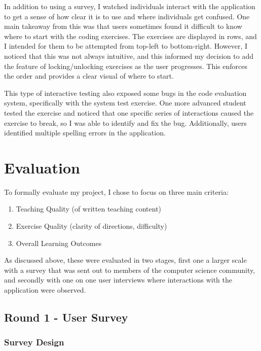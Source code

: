 \documentclass[10pt,twocolumn]{article}
\begin{document}
In addition to using a survey, I watched individuals interact with the application to get a sense of how clear it is to 
use and where individuals get confused. One main takeaway from this was that users sometimes found it difficult to know 
where to start with the coding exercises. The exercises are displayed in rows, and I intended for them to be attempted 
from top-left to bottom-right. However, I noticed that this was not always intuitive, and this informed my decision to 
add the feature of locking/unlocking exercises as the user progresses. This enforces the order and provides a clear visual
of where to start. 

This type of interactive testing also exposed some bugs in the code evaluation system, specifically with the system test
exercise. One more advanced student tested the exercise and noticed that one specific series of interactions caused the 
exercise to break, so I was able to identify and fix the bug. Additionally, users identified multiple spelling errors in 
the application. 


\section{Evaluation}

To formally evaluate my project, I chose to focus on three main criteria:

\begin{enumerate}
    \item Teaching Quality (of written teaching content)
    \item Exercise Quality (clarity of directions, difficulty)
    \item Overall Learning Outcomes
\end{enumerate}

As discussed above, these were evaluated in two stages, first one a larger scale with a survey that was sent out to 
members of the computer science community, and secondly with one on one user interviews where interactions with the 
application were observed. 

\subsection{Round 1 - User Survey}

\subsubsection{Survey Design}
\end{document}
